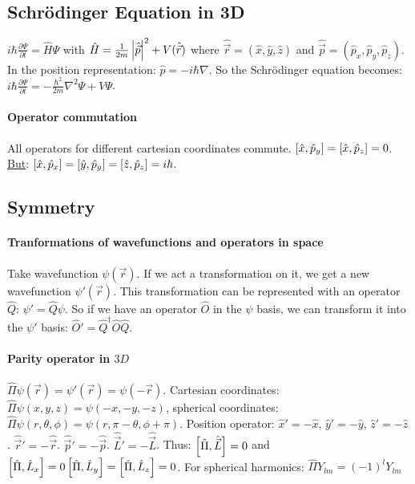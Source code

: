 \subsection{Schrödinger Equation in 3D}

$i \hbar \frac{\partial \Psi}{\partial t} = \hat{H} \Psi$ with
$\hat{H} = \frac{1}{2 m} \left\vert \hat{\vec{p}} \right\vert^2 + V(\hat{\vec{r}})$ where
$\hat{\vec{r}} = (\hat{x},\hat{y},\hat{z})$ and
$\hat{\vec{p}} = (\hat{p}_x , \hat{p}_y , \hat{p}_z)$.
In the position representation: $\hat{p} = - i \hbar \nabla$. So the Schrödinger
equation becomes: $i \hbar \frac{\partial \Psi}{\partial t} = - \frac{\hbar^2}{2 m}
\nabla^2 \Psi + V \Psi$.

\paragraph{Operator commutation}
All operators for different cartesian coordinates commute.
$\left[ \hat{x},\hat{p}_y \right] = \left[ \hat{x},\hat{p}_z \right] = 0$.
\underline{But}:
$\left[ \hat{x},\hat{p}_x \right] = \left[ \hat{y},\hat{p}_y \right] =
\left[ \hat{z},\hat{p}_z \right] = i \hbar$.



\subsection{Symmetry}

\paragraph{Tranformations of wavefunctions and operators in space}
Take wavefunction $\psi(\vec{r})$. If we act a transformation on it, we get a new
wavefunction $\psi'(\vec{r})$. This transformation can be represented with an operator
$\hat{Q}$: $\psi' = \hat{Q} \psi$. So if we have an operator $\hat{O}$ in the $\psi$
basis, we can transform it into the $\psi'$ basis: $\hat{O}' = \hat{Q}^\dagger \hat{O} \hat{Q}$.

\paragraph{Parity operator in $3D$}
$\hat{\Pi} \psi(\vec{r}) = \psi'(\vec{r}) = \psi(-\vec{r})$. Cartesian coordinates:
$\hat{\Pi} \psi(x,y,z) = \psi(-x,-y,-z)$, spherical coordinates:
$\hat{\Pi} \psi(r,\theta,\phi) = \psi(r,\pi - \theta, \phi + \pi)$.
Position operator: $\hat{x}' = - \hat{x}$, $\hat{y}' = - \hat{y}$, $\hat{z}' = - \hat{z}$.
$\hat{\vec{r}}' = - \hat{\vec{r}}$. $\hat{\vec{p}}' = -\hat{\vec{p}}$.
$\hat{\vec{L}}' = -\hat{\vec{L}}$. Thus: $\left[ \hat{\Pi},\hat{\vec{L}} \right] = 0$
and $\left[ \hat{\Pi},\hat{L}_x \right] = 0 \left[ \hat{\Pi},\hat{L}_y \right] =
\left[ \hat{\Pi},\hat{L}_z \right] = 0$. For spherical harmonics:
$\hat{\Pi} Y_{lm} = (-1)^l Y_{lm}$

